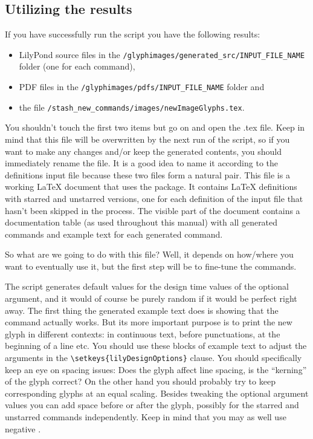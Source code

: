 \documentclass{OLLbook}
\begin{document}
\subsection{Utilizing the results}
\label{subsec:BGI_utilizing_results}

If you have successfully run the script you have the following results:
\begin{itemize}
\item LilyPond source files in the \texttt{/glyphimages/generated\_src/INPUT\_FILE\_NAME} folder (one for each command),
\item PDF files in the \texttt{/glyphimages/pdfs/INPUT\_FILE\_NAME} folder and
\item the file \texttt{/stash\_new\_commands/images/newImageGlyphs.tex}.
\end{itemize}
You shouldn't touch the first two items but go on and open the .tex file.
Keep in mind that this file will be overwritten by the next run of the script, so if you want to make any changes and/or keep the generated contents, you should immediately rename the file.
It is a good idea to name it according to the definitions input file because these two files form a natural pair.
This file is a working \LaTeX{} document that uses the \lilyglyphs package.
It contains \LaTeX{}  definitions with starred and unstarred versions, one for each definition of the input file that hasn't been skipped in the process.
The visible part of the document contains a documentation table (as used throughout this manual) with all generated commands and example text for each generated command.

So what are we going to do with this file?
Well, it depends on how/where you want to eventually use it, but the first step will be to fine-tune the commands.

The script generates default values for the design time values of the optional argument, and it would of course be purely random if it would be perfect right away.
The first thing the generated example text does is showing that the command actually works.
But its more important purpose is to print the new glyph in different contexts: in continuous text, before punctuations, at the beginning of a line etc.
You should use these blocks of example text to adjust the arguments in the \verb|\setkeys{lilyDesignOptions}| clause.
You should specifically keep an eye on spacing issues: Does the glyph affect line spacing, is the “kerning” of the glyph correct?
On the other hand you should probably try to keep corresponding glyphs at an equal scaling.
Besides tweaking the optional argument values you can add space before or after the glyph, possibly for the starred and unstarred commands independently.
Keep in mind that you may as well use negative .
\end{document}

